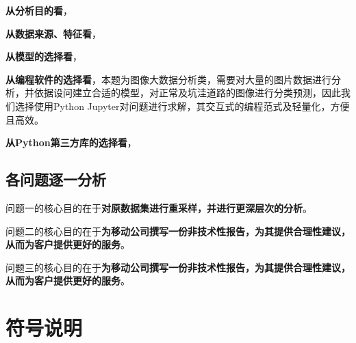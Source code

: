 \documentclass{MathorCupmodeling}
\begin{document}
	\textbf{从分析目的看}，

	\textbf{从数据来源、特征看}，
	
	\textbf{从模型的选择看}，

	\textbf{从编程软件的选择看}，本题为图像大数据分析类，需要对大量的图片数据进行分析，并依据设问建立合适的模型，对正常及坑洼道路的图像进行分类预测，因此我们选择使用Python Jupyter对问题进行求解，其交互式的编程范式及轻量化，方便且高效。

	\textbf{从Python第三方库的选择看}，

	\subsection{各问题逐一分析}
	问题一的核心目的在于\textbf{对原数据集进行重采样，并进行更深层次的分析}。

	问题二的核心目的在于\textbf{为移动公司撰写一份非技术性报告，为其提供合理性建议，从而为客户提供更好的服务}。

	问题三的核心目的在于\textbf{为移动公司撰写一份非技术性报告，为其提供合理性建议，从而为客户提供更好的服务}。
	\section{符号说明}
	\begin{center}
	\end{center}
\end{document}
